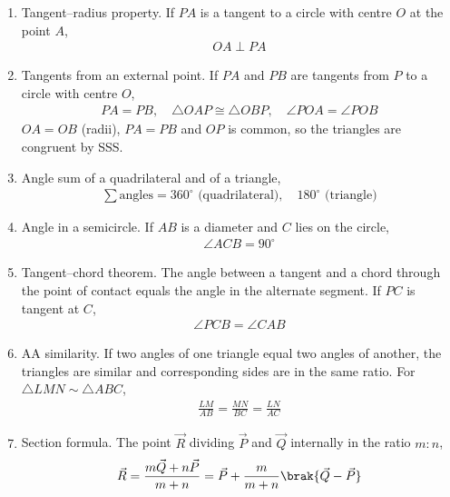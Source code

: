 \begin{enumerate}[label=\thesubsection.\arabic*, ref=\thesubsection.\theenumi]
\item Tangent--radius property. If $PA$ is a tangent to a circle with centre $O$ at the point $A$,
\begin{align}
	OA \perp PA \label{eq:CBSE25S2-tangent-radius}
\end{align}
\item Tangents from an external point. If $PA$ and $PB$ are tangents from $P$ to a circle with centre $O$,
\begin{align}
	PA = PB, \quad \triangle OAP \cong \triangle OBP, \quad \angle POA = \angle POB \label{eq:CBSE25S2-tangent-equal}
\end{align}
\solution
$OA = OB$ (radii), $PA = PB$ and $OP$ is common, so the triangles are congruent by SSS. 
\item Angle sum of a quadrilateral and of a triangle,
\begin{align}
	\sum \text{angles} = 360^\circ \text{ (quadrilateral)}, \quad 180^\circ \text{ (triangle)} \label{eq:CBSE25S2-angle-sum}
\end{align}
\item Angle in a semicircle. If $AB$ is a diameter and $C$ lies on the circle,
\begin{align}
	\angle ACB = 90^\circ \label{eq:CBSE25S2-semicircle}
\end{align}
\item Tangent--chord theorem. The angle between a tangent and a chord through the point of contact equals the angle in the alternate segment. If $PC$ is tangent at $C$,
\begin{align}
	\angle PCB = \angle CAB \label{eq:CBSE25S2-tangent-chord}
\end{align}
\item AA similarity. If two angles of one triangle equal two angles of another, the triangles are similar and corresponding sides are in the same ratio. For $\triangle LMN \sim \triangle ABC$,
\begin{align}
	\frac{LM}{AB} = \frac{MN}{BC} = \frac{LN}{AC} \label{eq:CBSE25S2-similar}
\end{align}
\item Section formula. The point $\vec{R}$ dividing $\vec{P}$ and $\vec{Q}$ internally in the ratio $m:n$,
\begin{align}
	\vec{R} = \frac{m\vec{Q} + n\vec{P}}{m+n} = \vec{P} + \frac{m}{m+n}\brak{\vec{Q}-\vec{P}} \label{eq:CBSE25S2-section}

\end{align}
\end{enumerate}
